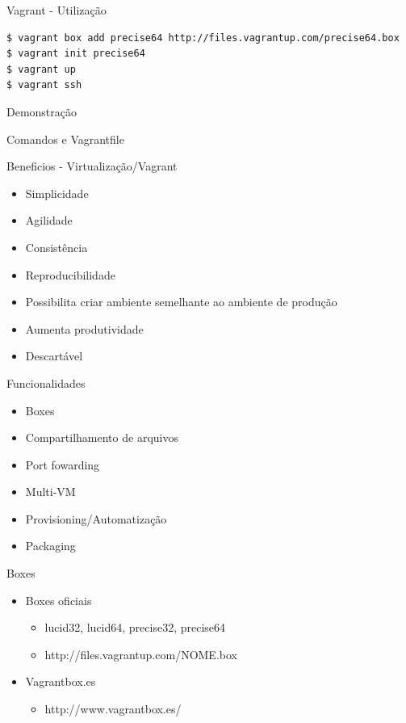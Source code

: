 \documentclass{beamer}
\begin{document}
\begin{frame}[fragile]{Vagrant - Utilização}
  \begin{verbatim}
$ vagrant box add precise64 http://files.vagrantup.com/precise64.box
$ vagrant init precise64
$ vagrant up
$ vagrant ssh
  \end{verbatim}
\end{frame}

\begin{frame}[plain,c]
  \begin{center}
    \Huge Demonstração
  \end{center}
  \begin{center}
    Comandos e Vagrantfile
  \end{center}
\end{frame}

\begin{frame}{Beneficios - Virtualização/Vagrant}
  \begin{itemize}
    \item Simplicidade
    \item Agilidade
    \item Consistência
    \item Reproducibilidade
    \item Possibilita criar ambiente semelhante ao ambiente de produção
    \item Aumenta produtividade
    \item Descartável
  \end{itemize}
\end{frame}

\begin{frame}{Funcionalidades}
  \begin{itemize}
    \item Boxes
    \item Compartilhamento de arquivos
    \item Port fowarding
    \item Multi-VM
    \item Provisioning/Automatização
    \item Packaging
  \end{itemize}
\end{frame}

\begin{frame}{Boxes}
  \begin{itemize}
    \item Boxes oficiais
    \begin{itemize}
      \item lucid32, lucid64, precise32, precise64
      \item http://files.vagrantup.com/NOME.box
    \end{itemize}
    \item Vagrantbox.es
    \begin{itemize}
      \item http://www.vagrantbox.es/
    \end{itemize}
  \end{itemize}
\end{frame}
\end{document}
